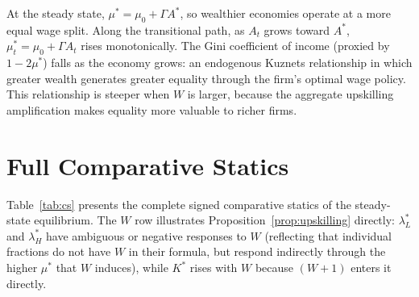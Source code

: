 \documentclass[12pt,a4paper]{article}
\begin{document}
At the steady state, $\mu^* = \mu_0 + \Gamma A^*$, so wealthier
economies operate at a more equal wage split. Along the transitional
path, as $A_t$ grows toward $A^*$, $\mu_t^* = \mu_0 + \Gamma A_t$
rises monotonically. The Gini coefficient of income (proxied by
$1-2\mu^*$) falls as the economy grows: an endogenous Kuznets
relationship in which greater wealth generates greater equality through
the firm's optimal wage policy. This relationship is steeper when $W$
is larger, because the aggregate upskilling amplification makes equality
more valuable to richer firms.

\section{Full Comparative Statics}

Table~\ref{tab:cs} presents the complete signed comparative statics
of the steady-state equilibrium. The $W$ row illustrates
Proposition~\ref{prop:upskilling} directly: $\lambda_L^*$ and
$\lambda_H^*$ have ambiguous or negative responses to $W$ (reflecting
that individual fractions do not have $W$ in their formula, but respond
indirectly through the higher $\mu^*$ that $W$ induces), while $K^*$
rises with $W$ because $(W+1)$ enters it directly.
\end{document}

